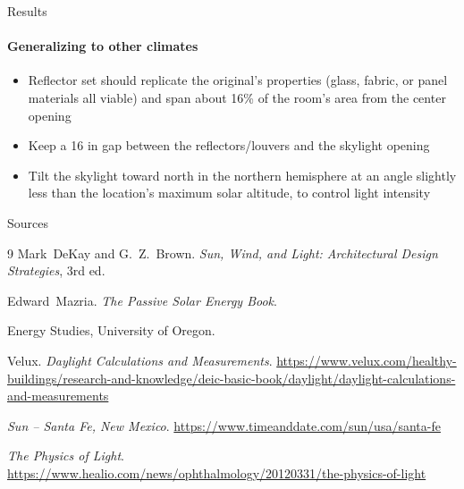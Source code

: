 \documentclass[aspectratio=168, 10pt] {beamer}
\begin{document}
    \begin{frame}{Results}
      \framesubtitle{Generalizing to other climates}
      \begin{itemize}
        \item Reflector set should replicate the original's properties (glass, fabric, or panel materials all viable) and span about 16\% of the room's area from the center opening
        \item Keep a 16 in gap between the reflectors/louvers and the skylight opening
        \item Tilt the skylight toward north in the northern hemisphere at an angle slightly less than the location's maximum solar altitude, to control light intensity
      \end{itemize}
    \end{frame}

    \begin{frame}[label=bibliography]{Sources}
      \begin{thebibliography}{9}
            Mark~DeKay and G.~Z.~Brown.
            \emph{Sun, Wind, and Light: Architectural Design Strategies}, 3rd ed.

            Edward~Mazria.
            \emph{The Passive Solar Energy Book}.

            Energy Studies, University of Oregon.

            Velux.
            \emph{Daylight Calculations and Measurements}.
            \url{https://www.velux.com/healthy-buildings/research-and-knowledge/deic-basic-book/daylight/daylight-calculations-and-measurements}

            \emph{Sun -- Santa Fe, New Mexico}.
            \url{https://www.timeanddate.com/sun/usa/santa-fe}

            \emph{The Physics of Light}.
            \url{https://www.healio.com/news/ophthalmology/20120331/the-physics-of-light}
      \end{thebibliography}
    \end{frame}
\end{document}
